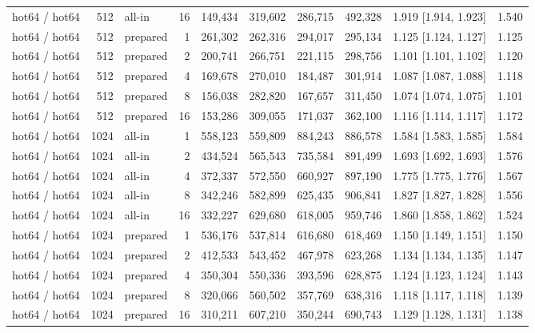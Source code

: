 \begin{table}[t]
{\begin{tabular}{lrlrrrrrlr}
hot64 / hot64 & 512 & all-in & 16 & 149{,}434 & 319{,}602 & 286{,}715 & 492{,}328 & 1.919 [1.914, 1.923] & 1.540 \\
hot64 / hot64 & 512 & prepared & 1 & 261{,}302 & 262{,}316 & 294{,}017 & 295{,}134 & 1.125 [1.124, 1.127] & 1.125 \\
hot64 / hot64 & 512 & prepared & 2 & 200{,}741 & 266{,}751 & 221{,}115 & 298{,}756 & 1.101 [1.101, 1.102] & 1.120 \\
hot64 / hot64 & 512 & prepared & 4 & 169{,}678 & 270{,}010 & 184{,}487 & 301{,}914 & 1.087 [1.087, 1.088] & 1.118 \\
hot64 / hot64 & 512 & prepared & 8 & 156{,}038 & 282{,}820 & 167{,}657 & 311{,}450 & 1.074 [1.074, 1.075] & 1.101 \\
hot64 / hot64 & 512 & prepared & 16 & 153{,}286 & 309{,}055 & 171{,}037 & 362{,}100 & 1.116 [1.114, 1.117] & 1.172 \\
hot64 / hot64 & 1024 & all-in & 1 & 558{,}123 & 559{,}809 & 884{,}243 & 886{,}578 & 1.584 [1.583, 1.585] & 1.584 \\
hot64 / hot64 & 1024 & all-in & 2 & 434{,}524 & 565{,}543 & 735{,}584 & 891{,}499 & 1.693 [1.692, 1.693] & 1.576 \\
hot64 / hot64 & 1024 & all-in & 4 & 372{,}337 & 572{,}550 & 660{,}927 & 897{,}190 & 1.775 [1.775, 1.776] & 1.567 \\
hot64 / hot64 & 1024 & all-in & 8 & 342{,}246 & 582{,}899 & 625{,}435 & 906{,}841 & 1.827 [1.827, 1.828] & 1.556 \\
hot64 / hot64 & 1024 & all-in & 16 & 332{,}227 & 629{,}680 & 618{,}005 & 959{,}746 & 1.860 [1.858, 1.862] & 1.524 \\
hot64 / hot64 & 1024 & prepared & 1 & 536{,}176 & 537{,}814 & 616{,}680 & 618{,}469 & 1.150 [1.149, 1.151] & 1.150 \\
hot64 / hot64 & 1024 & prepared & 2 & 412{,}533 & 543{,}452 & 467{,}978 & 623{,}268 & 1.134 [1.134, 1.135] & 1.147 \\
hot64 / hot64 & 1024 & prepared & 4 & 350{,}304 & 550{,}336 & 393{,}596 & 628{,}875 & 1.124 [1.123, 1.124] & 1.143 \\
hot64 / hot64 & 1024 & prepared & 8 & 320{,}066 & 560{,}502 & 357{,}769 & 638{,}316 & 1.118 [1.117, 1.118] & 1.139 \\
hot64 / hot64 & 1024 & prepared & 16 & 310{,}211 & 607{,}210 & 350{,}244 & 690{,}743 & 1.129 [1.128, 1.131] & 1.138 \\
\bottomrule
\end{tabular}}
\end{table}


